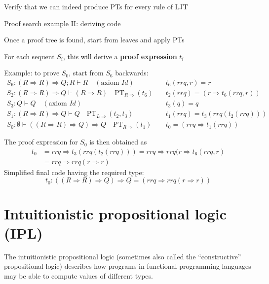 Verify that we can indeed produce PTs for every rule of LJT

Proof search example II: deriving code

Once a proof tree is found, start from leaves and apply PTs

For each sequent $S_{i}$, this will derive a \textbf{proof expression}
$t_{i}$

Example: to prove $S_{0}$, start from $S_{6}$ backwards:{\footnotesize{}
\begin{align*}
S_{6}:\left(R\Rightarrow R\right)\Rightarrow Q;R\vdash R\quad(\text{axiom }Id)\quad & t_{6}(rrq,r)=r\\
S_{2}:\left(R\Rightarrow R\right)\Rightarrow Q\vdash\left(R\Rightarrow R\right)\quad\text{PT}_{R\Rightarrow}(t_{6})\quad & t_{2}(rrq)=\left(r\Rightarrow t_{6}(rrq,r)\right)\\
S_{3}:Q\vdash Q\quad(\text{axiom }Id)\quad & t_{3}(q)=q\\
S_{1}:\left(R\Rightarrow R\right)\Rightarrow Q\vdash Q\quad\text{PT}_{L\Rightarrow}(t_{2},t_{3})\quad & t_{1}(rrq)=t_{3}(rrq(t_{2}(rrq)))\\
S_{0}:\emptyset\vdash\left(\left(R\Rightarrow R\right)\Rightarrow Q\right)\Rightarrow Q\quad\text{PT}_{R\Rightarrow}(t_{1})\quad & t_{0}=\left(rrq\Rightarrow t_{1}(rrq)\right)
\end{align*}
}{\footnotesize\par}

The proof expression for $S_{0}$ is then obtained as
\begin{align*}
t_{0} & =rrq\Rightarrow t_{3}\left(rrq\left(t_{2}\left(rrq\right)\right)\right)=rrq\Rightarrow rrq(r\Rightarrow t_{6}\left(rrq,r\right)\\
 & =rrq\Rightarrow rrq\left(r\Rightarrow r\right)
\end{align*}
Simplified final code having the required type: 
\[
t_{0}:\left(\left(R\Rightarrow R\right)\Rightarrow Q\right)\Rightarrow Q=\left(rrq\Rightarrow rrq\left(r\Rightarrow r\right)\right)
\]


\section{Intuitionistic propositional logic (IPL)}

The intuitionistic propositional logic (sometimes also called the
``constructive'' propositional logic) describes how programs in
functional programming languages may be able to compute values of
different types.


